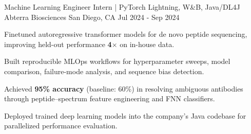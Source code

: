 \documentclass[11pt, a4paper]{awesome-cv}
\begin{document}
\begin{cventries}
  \cventry
    {Machine Learning Engineer Intern | PyTorch Lightning, W\&B, Java/DL4J}
    {Abterra Biosciences}
    {San Diego, CA}
    {Jul 2024 - Sep 2024}
    {
      \begin{cvitems}
        \item {Finetuned autoregressive transformer models for de novo peptide sequencing, improving held-out performance \textbf{4$\times$} on in-house data.}
        \item {Built reproducible MLOps workflows for hyperparameter sweeps, model comparison, failure-mode analysis, and sequence bias detection.}
        \item {Achieved \textbf{95\% accuracy} (baseline: 60\%) in resolving ambiguous antibodies through peptide–spectrum feature engineering and FNN classifiers.}
        \item {Deployed trained deep learning models into the company's Java codebase for parallelized performance evaluation.}
      \end{cvitems}
    }
    

\end{cventries}
\end{document}

